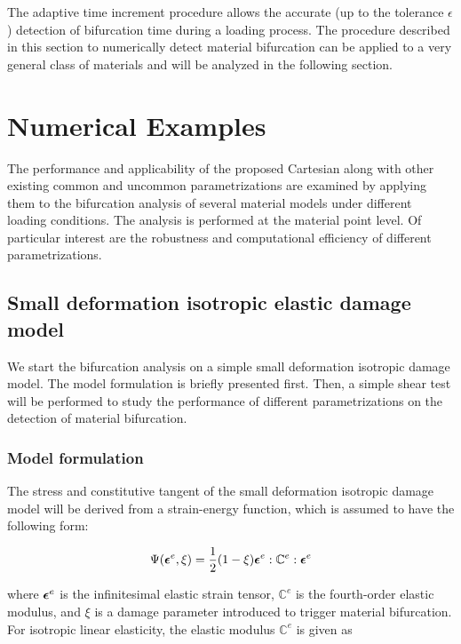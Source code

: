 \documentclass[12pt]{article}
\numberwithin{equation}{section}
\begin{document}
The adaptive time increment procedure allows the accurate (up to the
tolerance $\epsilon$) detection of bifurcation time during a loading
process. The procedure described in this section to numerically detect
material bifurcation can be applied to a very general class of
materials and will be analyzed in the following section.

\section{Numerical Examples}
\label{sec:numerical-examples}

The performance and applicability of the proposed Cartesian along with
other existing common and uncommon parametrizations are examined by
applying them to the bifurcation analysis of several material models
under different loading conditions. The analysis is performed at the
material point level. Of particular interest are the robustness and
computational efficiency of different parametrizations.

\subsection{Small deformation isotropic elastic damage model}
\label{subsec:isotropic}

We start the bifurcation analysis on a simple small deformation
isotropic damage model. The model formulation is briefly presented
first. Then, a simple shear test will be performed to study the
performance of different parametrizations on the detection of material
bifurcation.

\subsubsection{Model formulation}

The stress and constitutive tangent of the small deformation isotropic
damage model will be derived from a strain-energy function, which is
assumed to have the following form:

\begin{equation}\label{eq:iso_psi}
 \Psi({\boldsymbol{\epsilon}} ^e, \xi)
   = \frac{1}{2} (1 - \xi)
     {\boldsymbol{\epsilon}} ^e : \mathbb{C}^e : {\boldsymbol{\epsilon}} ^e
\end{equation}

where ${\boldsymbol{\epsilon}}^e$ is the infinitesimal elastic strain tensor,
$\mathbb{C}^e$ is the fourth-order elastic modulus, and $\xi$
is a damage parameter introduced to trigger material bifurcation. For
isotropic linear elasticity, the elastic modulus $\mathbb{C}^e$ is
given as
\end{document}
